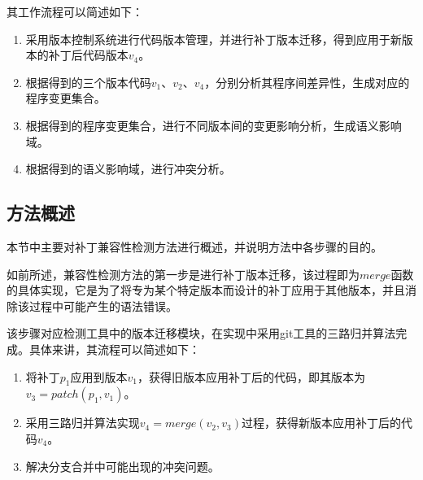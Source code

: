 其工作流程可以简述如下：

\begin{enumerate}
	\item 采用版本控制系统进行代码版本管理，并进行补丁版本迁移，得到应用于新版本的补丁后代码版本$v_4$。
	\item 根据得到的三个版本代码$v_1$、$v_2$、$v_4$，分别分析其程序间差异性，生成对应的程序变更集合。
	\item 根据得到的程序变更集合，进行不同版本间的变更影响分析，生成语义影响域。
	\item 根据得到的语义影响域，进行冲突分析。
\end{enumerate}

\subsection{方法概述}



本节中主要对补丁兼容性检测方法进行概述，并说明方法中各步骤的目的。

如前所述，兼容性检测方法的第一步是进行补丁版本迁移，该过程即为$merge$函数的具体实现，它是为了将专为某个特定版本而设计的补丁应用于其他版本，并且消除该过程中可能产生的语法错误。

该步骤对应检测工具中的版本迁移模块，在实现中采用git工具的三路归并算法完成。具体来讲，其流程可以简述如下：
\begin{enumerate}
	\item 将补丁$p_1$应用到版本$v_1$，获得旧版本应用补丁后的代码，即其版本为$v_3 = patch(p_1,v_1)$。
	\item 采用三路归并算法实现$v_4 = merge(v_2,v_3)$过程，获得新版本应用补丁后的代码$v_4$。
	\item 解决分支合并中可能出现的冲突问题。
\end{enumerate}

